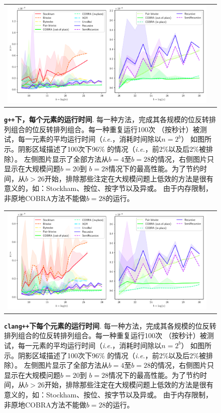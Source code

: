 \documentclass[10pt]{article}
\begin{document}
\begin{CJK*}{UTF8}{gbsn}
\begin{figure}[ht!]
\centering
\begin{tabular}{cc}
  \includegraphics[width=6in]{results/g++_run_times.pdf}
\end{tabular}
\caption{{\bf {\tt g++}下，每个元素的运行时间}. 
  每一种方法，完成其各规模的位反转排列组合的位反转排列组合。每一种重复运行100次
  （按秒计）被测试，每一元素的平均运行时间（\emph{i.e.}，消耗时间除以$n = 2^b$）
  如图所示。阴影区域描述了100次下96\% 的情况（\emph{i.e.}，前2\%以及后2\%被排除）。
  左侧图片显示了全部方法从$b=4$至$b=28$的情况，右侧图片只显示在大规模问题$b=20$到
  $b=28$情况下的最高性能。为了节约时间，从$b>26$开始，排除那些注定在大规模问题上低效的方法是很有意义的，如：Stockham、按位、按字节以及异或。
  由于内存限制，非原地COBRA方法不能做$b=28$的运行。
  \label{fig:g++_runtimes}  
}
\end{figure}

\begin{figure}[ht!]
\centering
\begin{tabular}{cc}
  \includegraphics[width=6in]{results/clang++_run_times.pdf}
\end{tabular}
\caption{{\bf {\tt clang++}下每个元素的运行时间}. 每一种方法，完成其各规模的位反转排列组合的位反转排列组合。每一种重复运行100次
  （按秒计）被测试，每一元素的平均运行时间（\emph{i.e.}，消耗时间除以$n = 2^b$）
  如图所示。阴影区域描述了100次下96\% 的情况（\emph{i.e.}，前2\%以及后2\%被排除）。
  左侧图片显示了全部方法从$b=4$至$b=28$的情况，右侧图片只显示在大规模问题$b=20$到
  $b=28$情况下的最高性能。为了节约时间，从$b>26$开始，排除那些注定在大规模问题上低效的方法是很有意义的，如：Stockham、按位、按字节以及异或。
  由于内存限制，非原地COBRA方法不能做$b=28$的运行。
  \label{fig:clang++_runtimes}  
}
\end{figure}


\end{CJK*}
\end{document}
